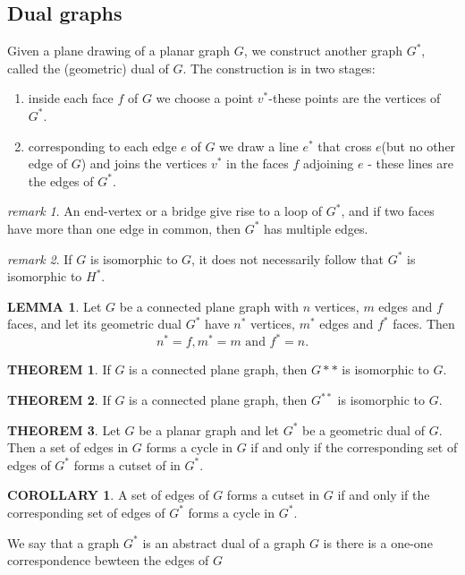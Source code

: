 \documentclass[a4paper,11pt]{article}%
\theoremstyle{remark}
\newtheorem*{remark}{remark}
\theoremstyle{definition}
\newtheorem{theorem}{THEOREM}[section]
\theoremstyle{definition}
\newtheorem{corollary}{COROLLARY}[section]
\theoremstyle{definition}
\newtheorem{lemma}{LEMMA}[section]
\theoremstyle{definition}
\theoremstyle{plain}
\theoremstyle{definition}
\begin{document}
\subsection{Dual graphs}
Given a plane drawing of a planar graph $G$, we construct another graph $G^*$, called the (geometric) dual of $G$.
The construction is in two stages:
\begin{enumerate}
    \item inside each face $f$ of $G$ we choose a point $v^*$-these points are the vertices of $G^*$.
    \item corresponding to each edge $e$ of $G$ we draw a line $e^*$ that cross $e$(but no other edge of $G$)
    and joins the vertices $v^*$ in the faces $f$ adjoining $e$ - these lines are the edges of $G^*$.
\end{enumerate}
\begin{remark}
An end-vertex or a bridge give rise to a loop of $G^*$, and if two faces have more than one edge in common, then $G^*$ has multiple edges.
\end{remark}
\begin{remark}
    If $G$ is isomorphic to $G$, it does not necessarily follow that $G^*$ is isomorphic to $H^*$.
\end{remark}
\begin{lemma}
    Let $G$ be a connected plane graph with $n$ vertices, $m$ edges and $f$ faces, and let its geometric dual $G^*$ have $n^*$
    vertices, $m^*$ edges  and $f^*$ faces. Then 
    \[n^*=f,m^*=m \text{ and }f^*=n.\]
\end{lemma}
\begin{theorem}
    If $G$ is a connected plane graph, then $G**$ is isomorphic to $G$.
\end{theorem}
\begin{theorem}
    If $G$ is a connected plane graph, then $G^{**}$ is isomorphic to $G.$
\end{theorem}
\begin{theorem}
    Let $G$ be a planar graph and let $G^*$ be a geometric dual of $G$. Then a set of edges in $G$ forms a cycle in $G$ if 
    and only if the corresponding set of edges of $G^*$ forms a cutset of in $G^*$.
\end{theorem}
\begin{corollary}
    A set of edges of $G$ forms a cutset in $G$ if and only if the corresponding set of edges of $G^*$ forms a cycle in $G^*$.
\end{corollary}
We say that a graph $G^*$ is an abstract dual of a graph $G$ is there is a one-one correspondence bewteen the edges of $G$
\end{document}
